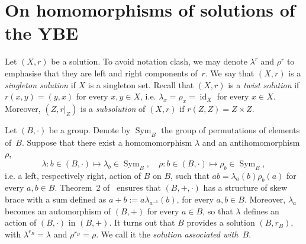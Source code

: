 \documentclass[12pt, a4paper, english]{article}
\theoremstyle{definition}
\theoremstyle{remark}
\begin{document}
\section{On homomorphisms of solutions of the YBE}
\label{sec:morphisms}


Let $(X,r)$ be a solution. To avoid notation clash, we may denote $\lambda^r$ and $\rho^r$ to emphasise that they are left and right components of~$r$. We say that $(X,r)$ is a \emph{singleton solution} if $X$ is a singleton set. Recall that $(X,r)$ is a \emph{twist solution} if $r(x,y) = (y,x)$ for every $x,y\in X$, i.e. $\lambda_x = \rho_x = \operatorname{id}_X$ for every $x \in X$. Moreover, $(Z,\left.r\right|_Z)$ is a \emph{subsolution} of $(X,r)$ if $r(Z,Z) = Z\times Z$.


Let $(B,\cdot)$ be a group. Denote by $\operatorname{Sym}_B$ the group of permutations of elements of~$B$. Suppose that there exist a homomomorphism $\lambda$ and an antihomomorphism $\rho$,
\[ \lambda \colon b\in (B,\cdot) \mapsto \lambda_b \in \operatorname{Sym}_B, \quad \rho \colon b \in (B,\cdot) \mapsto \rho_b\in \operatorname{Sym}_B,\]
i.e. a left, respectively right, action of $B$ on $B$, such that  $ab = \lambda_a(b)\rho_b(a)$ for every $a,b\in B$. Theorem~2 of~\cite{LuYanZhu00} ensures that $(B,+,\cdot)$ has a structure of skew brace with a sum defined as $a+b:= a\lambda_{a^{-1}}(b)$, for every $a,b\in B$. Moreover, $\lambda_a$ becomes an automorphism of $(B,+)$ for every $a \in B$, so that $\lambda$ defines an action of $(B,\cdot)$ in $(B,+)$. It turns out that $B$ provides a solution $(B,r_B)$, with $\lambda^{r_B} = \lambda$ and $\rho^{r_B} = \rho$. We call it the \emph{solution associated with~$B$}.
\end{document}
